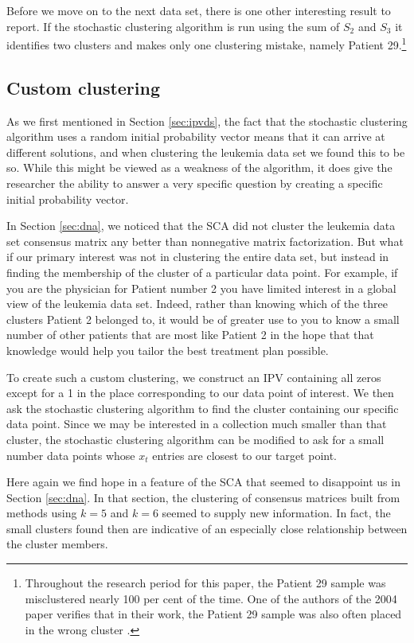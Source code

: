 \documentclass[final]{siamltex}
\begin{document}
Before we move on to the next data set, there is one other interesting result to report. If the stochastic clustering algorithm is run using the sum of $S_{2}$ and $S_{3}$ it identifies two clusters and makes only one clustering mistake, namely Patient 29.\footnote{Throughout the research period for this paper, the Patient 29 sample was misclustered nearly 100 per cent of the time. One of the authors of the 2004 paper verifies that in their work, the Patient 29 sample was also often placed in the wrong cluster \cite{tamayo2011pc}.}

\subsection{Custom clustering}
As we first mentioned in Section \ref{sec:ipvds}, the fact that the stochastic clustering algorithm uses a random initial probability vector means that it can arrive at different solutions, and when clustering the leukemia data set we found this to be so. While this might be viewed as a weakness of the algorithm, it does give the researcher the ability to answer a very specific question by creating a specific initial probability vector. 

In Section \ref{sec:dna}, we noticed that the SCA did not cluster the leukemia data set consensus matrix any better than nonnegative matrix factorization. But what if our primary interest was not in clustering the entire data set, but instead in finding the membership of the cluster of a particular data point. For example, if you are the physician for Patient number 2 you have limited interest in a global view of the leukemia data set. Indeed, rather than knowing which of the three clusters Patient 2 belonged to, it would be of greater use to you to know a small number of other patients that are most like Patient 2 in the hope that that knowledge would help you tailor the best treatment plan possible. 

To create such a custom clustering, we construct an IPV containing all zeros except for a 1 in the place corresponding to our data point of interest. We then ask the stochastic clustering algorithm to find the cluster containing our specific data point. Since we may be interested in a collection much smaller than that cluster, the stochastic clustering algorithm can be modified to ask for a small number data points whose $x_{t}$ entries are closest to our target point.

Here again we find hope in a feature of the SCA that seemed to disappoint us in Section \ref{sec:dna}. In that section, the clustering of consensus matrices built from methods using $k=5$ and $k=6$ seemed to supply new information. In fact, the small clusters found then are indicative of an especially close relationship between the cluster members.
\end{document}
